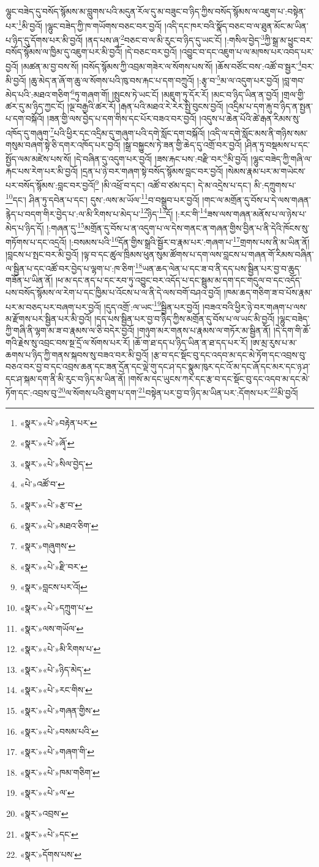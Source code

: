 ལྷུང་བཟེད་དུ་བསོད་སྙོམས་མ་བླུགས་པའི་མདུན་རོལ་དུ་མ་བཟུང་བ་ཉིད་ཀྱིས་བསོད་སྙོམས་ལ་འཇུག་པ་:བསྟེན་པར་\footnote{«སྣར་»«པེ་»བརྟེན་པར་}མི་བྱའོ། །ལྷུང་བཟེད་ཀྱི་ཁ་གཡོགས་བཅང་བར་བྱའོ། །འདི་དང་ཁར་བའི་སྣོད་བཅང་བ་ལ་ཐུན་མོང་མ་ཡིན་པ་ཉིད་དུ་དོགས་པར་མི་བྱའོ། །ནད་པས་ཞྭ་\footnote{«སྣར་»«པེ་»ཞྭོ་}བཅང་བ་ལ་མི་རུང་བ་ཉིད་དུ་ཡང་ངོ། །:གསིལ་བྱེད་\footnote{«སྣར་»«པེ་»སིལ་བྱེད་}ཀྱི་སྒྲ་མ་ཕྱུང་བར་བསོད་སྙོམས་ལ་ཁྱིམ་དུ་འཇུག་པར་མི་བྱའོ། །དེ་བཅང་བར་བྱའོ། །འབྱུང་བ་དང་འཇུག་པ་ལ་མཁས་པར་འབད་པར་བྱའོ། །མཚན་མ་བྱ་བས་སོ། །བསོད་སྙོམས་ཀྱི་འབྲམ་གཟེར་ལ་སོགས་པས་སོ། །ཆོས་བཙོང་བས་:འཚོ་བ་སྦྱར་\footnote{«པེ་»འཚོ་བ་}བར་མི་བྱའོ། །ཆུ་མེད་ན་ཞོ་ག་ཆུ་ལ་སོགས་པའི་ཁུ་བས་རྐང་པ་དག་བཀྲུའོ། །:རྩྭ་བ་\footnote{«སྣར་»«པེ་»རྩ་བ་}མ་ལ་འདུག་པར་བྱའོ། །བླ་གབ་མེད་པའི་:མཐའ་གཅིག་\footnote{«སྣར་»«པེ་»མཐའ་ཅིག་}ཏུ་གཞག་གོ། །སྤུངས་ཏེ་ཡང་ངོ། །མཇུག་ཏུ་དོར་རོ། །མང་བ་ཉིད་ཡིན་ན་བྱའོ། །གྲལ་གྱི་ཚར་དུ་མ་ཉིད་ཀྱང་ངོ། །ལྔ་བརྒྱའི་ཚར་རོ། །རྒན་པའི་མཐའ་རེ་རེར་སྤྱི་བུངས་བྱའོ། །འདྲིམ་པ་དག་རྐུ་བ་ཉིད་ན་སྤྱན་པ་དག་བསྐོའོ། །ཟན་གྱི་ལས་བྱེད་པ་དག་གིས་དང་པོར་བཟའ་བར་བྱའོ། །འདུས་པ་ཆེན་པོའི་ཚེ་རྒན་རིམས་སུ་འཁོད་དུ་གཞུག་\footnote{«སྣར་»གཞུགས་}པའི་ཕྱིར་དང་འདྲིམ་དུ་གཞུག་པའི་དགེ་སློང་དག་བསྐོའོ། །འདི་ལ་དགེ་སློང་མས་ནི་གཉིས་སམ་གསུམ་བཞག་སྟེ་ཅི་དགར་འཁོད་པར་བྱའོ། །སྒྲ་བསྐྱུངས་ཏེ་ཟན་གྱི་ཆེད་དུ་འགྲོ་བར་བྱའོ། །ཤིན་ཏུ་བསྡམས་པ་དང་སྤྱོད་ལམ་མཛེས་པས་སོ། །དེ་བཞིན་དུ་འདུག་པར་བྱའོ། །ཟས་རྐང་པས་:བརྫི་བར་\footnote{«སྣར་»«པེ་»རྫི་བར་}མི་བྱའོ། །ལྷུང་བཟེད་ཀྱི་གཞི་ལ་རྐང་པས་རེག་པར་མི་བྱའོ། །དྲན་པ་ཉེ་བར་གཞག་སྟེ་བསོད་སྙོམས་བླང་བར་བྱའོ། །སེམས་རྣམ་པར་མ་གཡེངས་པར་བསོད་སྙོམས་:བླང་བར་བྱའོ།\footnote{«སྣར་»བླངས་པར་འོ།} །མི་འཕྲོ་བ་དང་། འཚོ་བ་ཙམ་དང་། དེ་མ་འདྲེས་པ་དང་། མི་:དཀྲུགས་པ་\footnote{«སྣར་»«པེ་»དཀྲུག་པ་}དང་། ཤིན་ཏུ་དབེན་པ་དང་། དུས་:ལས་མ་ཡོལ་\footnote{«སྣར་»ལས་གཡོལ་}བ་བསྒྲུབ་པར་བྱའོ། །གང་ལ་མགྲོན་དུ་བོས་པ་དེ་ལས་གཞན་རྙེད་པ་བདག་གིར་བྱེད་པ་:ལ་མི་རིགས་པ་མེད་པ་\footnote{«སྣར་»«པེ་»མི་རིགས་པ་}ཉིད་\footnote{«སྣར་»«པེ་»ཉིད་མེད་}དོ། །:རང་གི་\footnote{«སྣར་»«པེ་»རང་གིས་}ཟས་ལས་གཞན་མནོས་པ་ལ་ཉེས་པ་མེད་པ་ཉིད་དོ། །:གཞན་དུ་\footnote{«སྣར་»«པེ་»གཞན་གྱིས་}མགྲོན་དུ་བོས་པ་ན་འདུག་པ་ལ་དེས་གནང་ན་གཞན་གྱིས་བྱིན་པ་ནི་དེའི་ཁོངས་སུ་གཏོགས་པ་དང་འདྲའོ། །:བསམས་པའི་\footnote{«སྣར་»«པེ་»བསམ་པའི་}དོན་གྱིས་སྒྲའི་སྦྱོར་བ་རྣམ་པར་:གཞག་པ་\footnote{«སྣར་»«པེ་»གཞག་གི་}གྲགས་པས་ནི་མ་ཡིན་ནོ། །བླངས་པ་སྤང་བར་མི་བྱའོ། །ལྟ་བ་དང་ཚུལ་ཁྲིམས་ཕུན་སུམ་ཚོགས་པ་དག་ལས་བླངས་པ་གཞན་གོ་རིམས་བཞིན་ལ་སྦྱིན་པ་དང་འཚོ་བར་བྱེད་པ་ལྷག་པ་:ཁ་ཅིག་\footnote{«སྣར་»«པེ་»ཁམ་གཅིག་}ཡན་ཆད་ལེན་པ་དང་ཟ་བ་ནི་དད་པས་སྦྱིན་པར་བྱ་བ་ཆུད་གཟོན་པ་ཡིན་ནོ། །ཕ་མ་དང་ནད་པ་དང་རབ་ཏུ་འབྱུང་བར་འདོད་པ་དང་སྦྲུམ་མ་དག་དང་གདུལ་བ་དང་འདོད་པས་བསོད་སྙོམས་ལ་རེག་པ་དང་ཁྱིམ་པ་འོངས་པ་ལ་ནི་དེ་ལས་བགོ་བཤའ་བྱའོ། །ཁམ་ཆད་གཅིག་ཟ་བ་པོས་རྣམ་པར་མ་བཅད་པར་བཞག་པར་བྱའོ། །དུད་འགྲོ་:ལ་ཡང་\footnote{«སྣར་»«པེ་»ལ་}སྦྱིན་པར་བྱའོ། །བཟའ་བའི་ཕྱིར་ཉེ་བར་གཞག་པ་ལས་མ་རྫོགས་པར་སྦྱིན་པར་མི་བྱའོ། །དད་པས་སྦྱིན་པར་བྱ་བ་ཉིད་ཀྱིས་མགྲོན་དུ་བོས་པ་ལ་ཡང་མི་བྱའོ། །ལྷུང་བཟེད་ཀྱི་གཞི་ནི་ལྷག་མ་ཟ་བ་རྣམས་ལ་ཅི་བདེར་བྱའོ། །གཉུག་མར་གནས་པ་རྣམས་ལ་གཏོར་མ་སྦྱིན་ནོ། །དེ་དག་གི་ཆོ་གའི་རྗེས་སུ་འབྲང་བས་སྔ་དྲོ་ལ་སོགས་པར་རོ། །ཆོ་ག་ཐ་དད་པ་ཉིད་ཡིན་ན་ཐ་དད་པར་རོ། །ཨ་མྲ་རུས་པ་མ་ཆགས་པ་ཉིད་ཀྱི་གནས་སྐབས་སུ་བཟའ་བར་མི་བྱའོ། །རྩ་བ་དང་སྡོང་བུ་དང་འདབ་མ་དང་མེ་ཏོག་དང་འབྲས་བུ་བཅའ་བར་བྱ་བ་དང་འབྲས་ཆན་དང་ཟན་དྲོན་དང་ལྡེ་གུ་དང་ཤ་དང་སྣུམ་ཁུར་དང་འོ་མ་དང་ཞོ་དང་མར་དང་ཉ་ཤ་དང་ཤ་སྐམ་དག་ནི་མི་རུང་བ་ཉིད་མ་ཡིན་ནོ། །གསོ་མ་དང་ཡུངས་ཀར་དང་རྩ་བ་དང་སྡོང་བུ་དང་འདབ་མ་དང་མེ་ཏོག་དང་:འབྲས་བུ་\footnote{«སྣར་»འབྲས་}ལ་སོགས་པའི་ཐུག་པ་དག་\footnote{«སྣར་»«པེ་»དང་}བསྟེན་པར་བྱ་བ་ཉིད་མ་ཡིན་པར་:དོགས་པར་\footnote{«སྣར་»དོགས་པས་}མི་བྱའོ། 